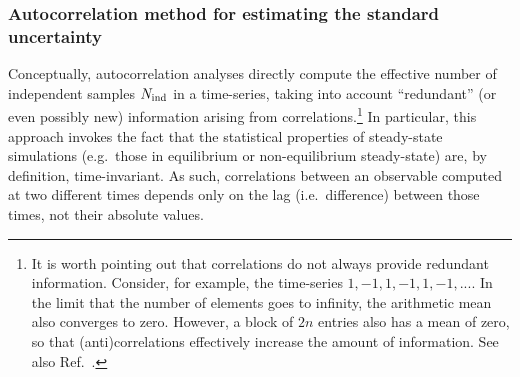 \subsubsection{Autocorrelation method for estimating the standard uncertainty}\label{sec:autocorrelation}

Conceptually, autocorrelation analyses directly compute the effective number of independent samples $N_{\rm ind}$ in a time-series, taking into account ``redundant'' (or even possibly new) information arising from correlations.\footnote{It is worth pointing out that correlations do not always provide redundant information.  Consider, for example, the time-series $1,-1,1,-1,1,-1,...$.  In the limit that the number of elements goes to infinity, the arithmetic mean also converges to zero.  However, a block of $2n$ entries also has a mean of zero, so that (anti)correlations effectively increase the amount of information.  See also Ref.~\cite{PatroneAIAA}. }  In particular, this approach invokes the fact that the statistical properties of steady-state simulations (e.g.\ those in equilibrium or non-equilibrium steady-state) are, by definition, time-invariant.  As such, correlations between an observable computed at two different times depends only on the lag (i.e.\ difference) between those times, not their absolute values.

